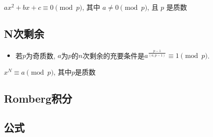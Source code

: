 \documentclass[landscape, twocolumn, 8pt, a4paper, twoside]{extarticle}
\begin{document}
    $ax^2 + bx + c \equiv 0 \pmod{p}$, 其中 $a \ne 0 \pmod{p}$, 且 $p$ 是质数
    
  
  \subsection{N次剩余}
    \begin{itemize}
    \item 若$p$为奇质数, $a$为$p$的$n$次剩余的充要条件是$a^{\frac{p - 1}{(a, p - 1)}} \equiv 1 \pmod{p}$.
    \end{itemize}
    $x^N \equiv a \pmod{p}$, 其中$p$是质数
    

  \subsection{Romberg积分}
    

  \subsection{公式}
\end{document}
